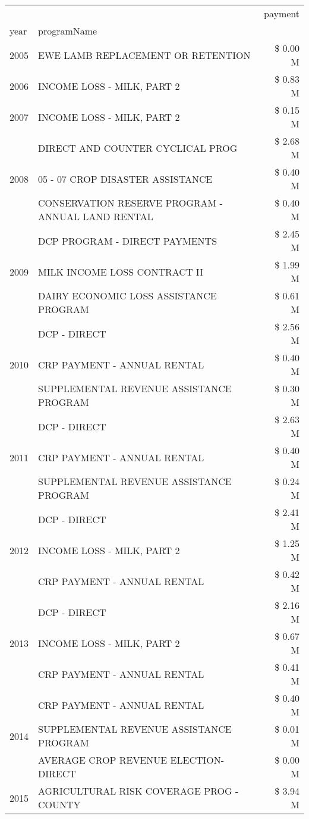 \begin{tabular}{llr}
\toprule
 &  & payment \\
year & programName &  \\
\midrule
2005 & EWE LAMB REPLACEMENT OR RETENTION & \$ 0.00 M \\
\cline{1-3}
2006 & INCOME LOSS - MILK, PART 2 & \$ 0.83 M \\
\cline{1-3}
2007 & INCOME LOSS - MILK, PART 2 & \$ 0.15 M \\
\cline{1-3}
\multirow[t]{3}{*}{2008} & DIRECT AND COUNTER CYCLICAL PROG & \$ 2.68 M \\
 & 05 - 07 CROP DISASTER ASSISTANCE & \$ 0.40 M \\
 & CONSERVATION RESERVE PROGRAM - ANNUAL LAND RENTAL & \$ 0.40 M \\
\cline{1-3}
\multirow[t]{3}{*}{2009} & DCP PROGRAM - DIRECT PAYMENTS & \$ 2.45 M \\
 & MILK INCOME LOSS CONTRACT II & \$ 1.99 M \\
 & DAIRY ECONOMIC LOSS ASSISTANCE PROGRAM & \$ 0.61 M \\
\cline{1-3}
\multirow[t]{3}{*}{2010} & DCP - DIRECT & \$ 2.56 M \\
 & CRP PAYMENT - ANNUAL RENTAL & \$ 0.40 M \\
 & SUPPLEMENTAL REVENUE ASSISTANCE PROGRAM & \$ 0.30 M \\
\cline{1-3}
\multirow[t]{3}{*}{2011} & DCP - DIRECT & \$ 2.63 M \\
 & CRP PAYMENT - ANNUAL RENTAL & \$ 0.40 M \\
 & SUPPLEMENTAL REVENUE ASSISTANCE PROGRAM & \$ 0.24 M \\
\cline{1-3}
\multirow[t]{3}{*}{2012} & DCP - DIRECT & \$ 2.41 M \\
 & INCOME LOSS - MILK, PART 2 & \$ 1.25 M \\
 & CRP PAYMENT - ANNUAL RENTAL & \$ 0.42 M \\
\cline{1-3}
\multirow[t]{3}{*}{2013} & DCP - DIRECT & \$ 2.16 M \\
 & INCOME LOSS - MILK, PART 2 & \$ 0.67 M \\
 & CRP PAYMENT - ANNUAL RENTAL & \$ 0.41 M \\
\cline{1-3}
\multirow[t]{3}{*}{2014} & CRP PAYMENT - ANNUAL RENTAL & \$ 0.40 M \\
 & SUPPLEMENTAL REVENUE ASSISTANCE PROGRAM & \$ 0.01 M \\
 & AVERAGE CROP REVENUE ELECTION-DIRECT & \$ 0.00 M \\
\cline{1-3}
\multirow[t]{3}{*}{2015} & AGRICULTURAL RISK COVERAGE PROG - COUNTY & \$ 3.94 M \\

\end{tabular}
